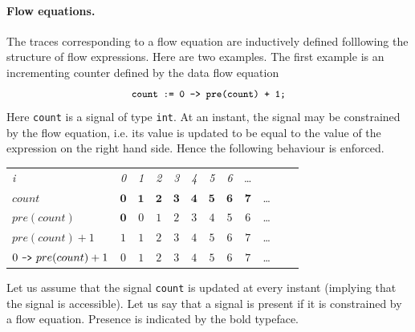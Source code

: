 \paragraph{Flow equations.}
The traces corresponding to a flow equation are inductively defined 
folllowing the structure of flow expressions. Here are two examples. The 
first example is an incrementing counter defined by the data flow 
equation
%
$$\texttt{\small{count := 0 -> pre(count) + 1;}}$$
%
Here \texttt{count} is a signal of type \texttt{int}. At an instant,
the signal may be constrained by the flow equation, i.e. its value
is updated to be equal to the value of the expression on the right hand side. 
Hence the following behaviour is enforced.
\begin{center}
  \leavevmode
  \begin{tabular}[]{l@{\quad}||@{\quad}ccccccccccc}
    \hline\hline   
     \hbox{{\footnotesize \textit{i}}} &{\footnotesize \textit{0}}
     &{\footnotesize \textit{1}}&{\footnotesize \textit{2}}
     &{\footnotesize \textit{3}}&{\footnotesize \textit{4}}
     &{\footnotesize \textit{5}}&{\footnotesize \textit{6}}&\ldots
   \\  
    \hbox{$count$} 
    &$\mathbf{0}$&$\mathbf{1}$&$\textbf{2}$&$\mathbf{3}$&$\mathbf{4}$&
    $\mathbf{5}$&$\mathbf{6}$&$\mathbf{7}$&\ldots
   \\
    \hbox{$pre(count)$} &$\mathbf{0}$&$\mathit{0}$&$\mathit{1}$&$\mathit{2}$&
    $\mathit{3}$&$\mathit{4}$&$\mathit{5}$&$\mathit{6}$&\ldots
   \\    
    \hbox{$pre(count) + 1$} 
    &$\mathit{1}$&$\mathit{1}$&$\mathit{2}$&$\mathit{3}$&
    $\mathit{4}$&$\mathit{5}$&$\mathit{6}$&$\mathit{7}$&\ldots
   \\
    \hbox{$0\ \pp{->}\ pre(count) + 1$} 
	 &$\mathit{0}$&$\mathit{1}$&$\mathit{2}$&$\mathit{3}$&
	 $\mathit{4}$&$\mathit{5}$&$\mathit{6}$&$\mathit{7}$&\ldots
   \\
     \hline\hline
  \end{tabular}
\end{center} 
Let us assume that the signal \texttt{count} is updated at every instant
(implying that the signal is accessible). Let us say that a signal is present
if it is constrained by a flow equation. Presence is indicated by the bold typeface. 

